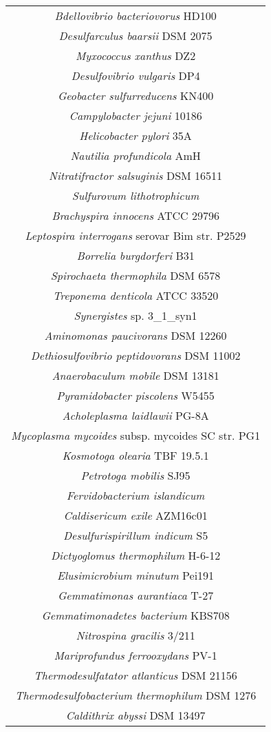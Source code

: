 \begin{longtable}
\begin{tabular}{|c|}
\textit{Bdellovibrio bacteriovorus} HD100\\
\textit{Desulfarculus baarsii} DSM 2075\\
\textit{Myxococcus xanthus} DZ2\\
\textit{Desulfovibrio vulgaris} DP4\\
\textit{Geobacter sulfurreducens} KN400\\
\textit{Campylobacter jejuni} 10186\\
\textit{Helicobacter pylori} 35A\\
\textit{Nautilia profundicola} AmH\\
\textit{Nitratifractor salsuginis} DSM 16511\\
\textit{Sulfurovum lithotrophicum}\\
\textit{Brachyspira innocens} ATCC 29796\\
\textit{Leptospira interrogans} serovar Bim str. P2529\\
\textit{Borrelia burgdorferi} B31\\
\textit{Spirochaeta thermophila} DSM 6578\\
\textit{Treponema denticola} ATCC 33520\\
\textit{Synergistes} sp. 3\_1\_syn1\\
\textit{Aminomonas paucivorans} DSM 12260\\
\textit{Dethiosulfovibrio peptidovorans} DSM 11002\\
\textit{Anaerobaculum mobile} DSM 13181\\
\textit{Pyramidobacter piscolens} W5455\\
\textit{Acholeplasma laidlawii} PG-8A\\
\textit{Mycoplasma mycoides} subsp. mycoides SC str. PG1\\
\textit{Kosmotoga olearia} TBF 19.5.1\\
\textit{Petrotoga mobilis} SJ95\\
\textit{Fervidobacterium islandicum}\\
\textit{Caldisericum exile} AZM16c01\\
\textit{Desulfurispirillum indicum} S5\\
\textit{Dictyoglomus thermophilum} H-6-12\\
\textit{Elusimicrobium minutum} Pei191\\
\textit{Gemmatimonas aurantiaca} T-27\\
\textit{Gemmatimonadetes bacterium} KBS708\\
\textit{Nitrospina gracilis} 3/211\\
\textit{Mariprofundus ferrooxydans} PV-1\\
\textit{Thermodesulfatator atlanticus} DSM 21156\\
\textit{Thermodesulfobacterium thermophilum} DSM 1276\\
\textit{Caldithrix abyssi} DSM 13497\\
\hline
\end{tabular}
\caption[]{}
\label{tab:edicer_genome_bacteria}
\end{longtable}


